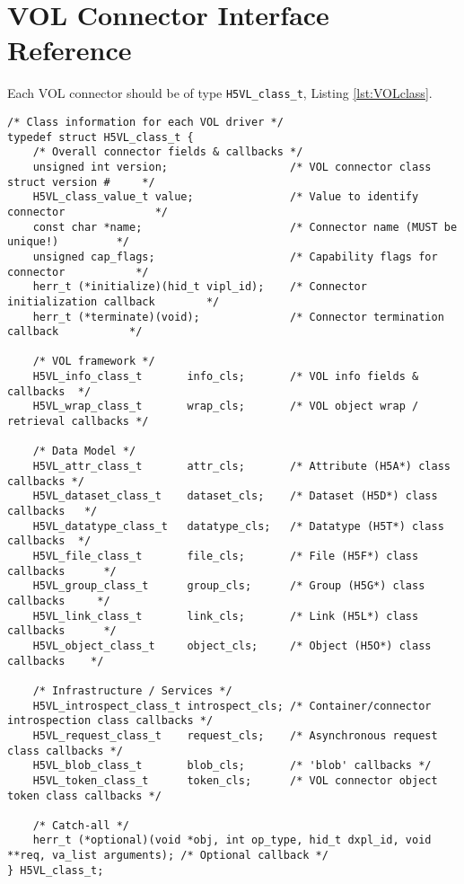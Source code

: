 \section{VOL Connector Interface Reference}
\label{sec:vol}
Each VOL connector should be of type \texttt{H5VL\_class\_t}, Listing \ref{lst:VOLclass}.

\hfill

\begin{lstlisting}[caption={VOL connector class, H5VLpublic.h},captionpos=b, label={lst:VOLclass}]
/* Class information for each VOL driver */
typedef struct H5VL_class_t {
    /* Overall connector fields & callbacks */                                   
    unsigned int version;                   /* VOL connector class struct version #     */
    H5VL_class_value_t value;               /* Value to identify connector              */
    const char *name;                       /* Connector name (MUST be unique!)         */
    unsigned cap_flags;                     /* Capability flags for connector           */
    herr_t (*initialize)(hid_t vipl_id);    /* Connector initialization callback        */
    herr_t (*terminate)(void);              /* Connector termination callback           */
                                                                                 
    /* VOL framework */                                                          
    H5VL_info_class_t       info_cls;       /* VOL info fields & callbacks  */   
    H5VL_wrap_class_t       wrap_cls;       /* VOL object wrap / retrieval callbacks */
                                                                                 
    /* Data Model */                                                             
    H5VL_attr_class_t       attr_cls;       /* Attribute (H5A*) class callbacks */
    H5VL_dataset_class_t    dataset_cls;    /* Dataset (H5D*) class callbacks   */
    H5VL_datatype_class_t   datatype_cls;   /* Datatype (H5T*) class callbacks  */
    H5VL_file_class_t       file_cls;       /* File (H5F*) class callbacks      */
    H5VL_group_class_t      group_cls;      /* Group (H5G*) class callbacks     */
    H5VL_link_class_t       link_cls;       /* Link (H5L*) class callbacks      */
    H5VL_object_class_t     object_cls;     /* Object (H5O*) class callbacks    */
                                                                                 
    /* Infrastructure / Services */
    H5VL_introspect_class_t introspect_cls; /* Container/connector introspection class callbacks */
    H5VL_request_class_t    request_cls;    /* Asynchronous request class callbacks */
    H5VL_blob_class_t       blob_cls;       /* 'blob' callbacks */
    H5VL_token_class_t      token_cls;      /* VOL connector object token class callbacks */
                                                                                 
    /* Catch-all */                                                              
    herr_t (*optional)(void *obj, int op_type, hid_t dxpl_id, void **req, va_list arguments); /* Optional callback */
} H5VL_class_t;
\end{lstlisting}

